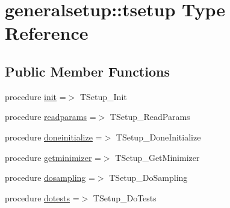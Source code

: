 \hypertarget{structgeneralsetup_1_1tsetup}{}\section{generalsetup\+:\+:tsetup Type Reference}
\label{structgeneralsetup_1_1tsetup}
\subsection*{Public Member Functions}
\begin{DoxyCompactItemize}
\item 
procedure \mbox{\hyperlink{structgeneralsetup_1_1tsetup_a2649e13ea2dd7fddb28ccbf243952795}{init}} =$>$ T\+Setup\+\_\+\+Init
\item 
procedure \mbox{\hyperlink{structgeneralsetup_1_1tsetup_ab601a2418f474b3e93d3752bd595f3ba}{readparams}} =$>$ T\+Setup\+\_\+\+Read\+Params
\item 
procedure \mbox{\hyperlink{structgeneralsetup_1_1tsetup_a8763a98a993f13722d651acd8bfb1c3c}{doneinitialize}} =$>$ T\+Setup\+\_\+\+Done\+Initialize
\item 
procedure \mbox{\hyperlink{structgeneralsetup_1_1tsetup_a7d48edee45d81de97ab375054a869fa0}{getminimizer}} =$>$ T\+Setup\+\_\+\+Get\+Minimizer
\item 
procedure \mbox{\hyperlink{structgeneralsetup_1_1tsetup_a4e0a414600bd6e049424184ec39cc2fa}{dosampling}} =$>$ T\+Setup\+\_\+\+Do\+Sampling
\item 
procedure \mbox{\hyperlink{structgeneralsetup_1_1tsetup_a1b2f852d7122a643819a08fee3328454}{dotests}} =$>$ T\+Setup\+\_\+\+Do\+Tests
\end{DoxyCompactItemize}
